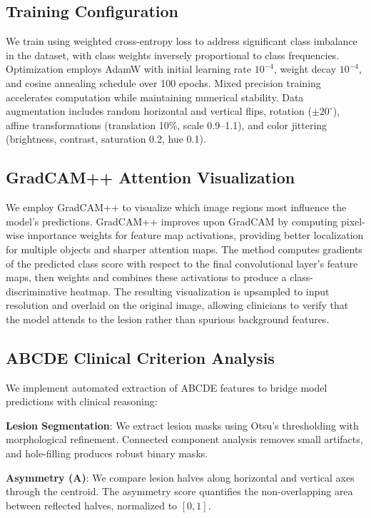 \subsection{Training Configuration}
\label{sec:methods-training}

We train using weighted cross-entropy loss to address significant class
imbalance in the dataset, with class weights inversely proportional to class
frequencies. Optimization employs AdamW with initial learning rate $10^{-4}$,
weight decay $10^{-4}$, and cosine annealing schedule over 100 epochs. Mixed
precision training accelerates computation while maintaining numerical
stability. Data augmentation includes random horizontal and vertical flips,
rotation ($\pm20^\circ$), affine transformations (translation 10\%, scale
0.9--1.1), and color jittering (brightness, contrast, saturation 0.2, hue 0.1).

\subsection{GradCAM++ Attention Visualization}

We employ GradCAM++ \cite{chattopadhay2018grad} to visualize which image
regions most influence the model's predictions. GradCAM++ improves upon
GradCAM by computing pixel-wise importance weights for feature map
activations, providing better localization for multiple objects and sharper
attention maps. The method computes gradients of the predicted class score
with respect to the final convolutional layer's feature maps, then weights
and combines these activations to produce a class-discriminative heatmap.
The resulting visualization is upsampled to input resolution and overlaid
on the original image, allowing clinicians to verify that the model attends
to the lesion rather than spurious background features.

\subsection{ABCDE Clinical Criterion Analysis}

We implement automated extraction of ABCDE features to bridge model
predictions with clinical reasoning:

\textbf{Lesion Segmentation}: We extract lesion masks using Otsu's
thresholding with morphological refinement. Connected component analysis
removes small artifacts, and hole-filling produces robust binary masks.

\textbf{Asymmetry (A)}: We compare lesion halves along horizontal and
vertical axes through the centroid. The asymmetry score quantifies the
non-overlapping area between reflected halves, normalized to $[0,1]$.

